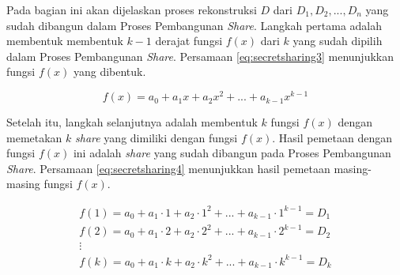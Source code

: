 Pada bagian ini akan dijelaskan proses rekonstruksi \begin{math}D\end{math} dari \begin{math}D_1, D_2, ..., D_n\end{math} yang sudah dibangun dalam Proses Pembangunan \textit{Share}. Langkah pertama adalah membentuk membentuk \begin{math}k-1\end{math} derajat fungsi \begin{math}f(x)\end{math} dari \begin{math}k\end{math} yang sudah dipilih dalam Proses Pembangunan \textit{Share}. Persamaan \ref{eq:secretsharing3} menunjukkan fungsi \begin{math}f(x)\end{math} yang dibentuk.

\begin{equation}
	f(x) = a_0 + a_1x + a_2x^2 + ... + a_{k-1}x^{k-1} \label{eq:secretsharing3}
\end{equation}

Setelah itu, langkah selanjutnya adalah membentuk \begin{math}k\end{math} fungsi \begin{math}f(x)\end{math} dengan memetakan \begin{math}k\end{math} \textit{share} yang dimiliki dengan fungsi \begin{math}f(x)\end{math}. Hasil pemetaan dengan fungsi \begin{math}f(x)\end{math} ini adalah \textit{share} yang sudah dibangun pada Proses Pembangunan \textit{Share}. Persamaan \ref{eq:secretsharing4} menunjukkan hasil pemetaan masing-masing fungsi \begin{math}f(x)\end{math}.

\begin{gather}
	f(1) = a_0 + a_1\cdot 1 + a_2\cdot 1^2 + ... + a_{k-1}\cdot 1^{k-1} = D_1 \nonumber \\
	f(2) = a_0 + a_1\cdot 2 + a_2\cdot 2^2 + ... + a_{k-1}\cdot 2^{k-1} = D_2 \nonumber \\
	\vdots \nonumber \\
	f(k) = a_0 + a_1\cdot k + a_2\cdot k^2 + ... + a_{k-1}\cdot k^{k-1} = D_k \label{eq:secretsharing4}
\end{gather}

